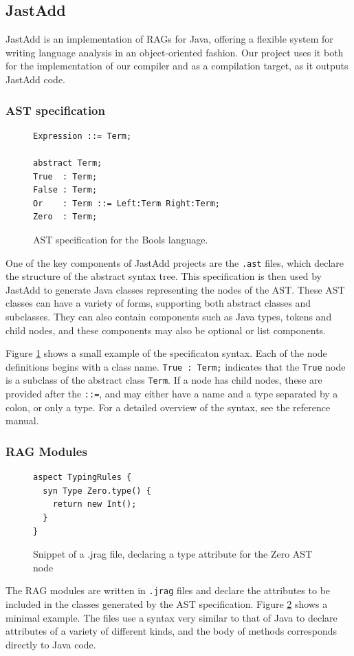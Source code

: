 \documentclass[nofilelist]{cslthse-msc}
\newcommand{\CR}[1]{\textcolor{green!60!black}{[\textbf{CR}:#1]}}
\begin{document}
\subsection{JastAdd}
JastAdd is an implementation of RAGs for Java, offering a flexible system for writing language analysis in an object-oriented fashion\cite{JastAdd}.
Our project uses it both for the implementation of our compiler and as a compilation target, as it outputs JastAdd code.

\subsubsection{AST specification}\label{astdef}
\begin{figure}[]
\begin{lstlisting}[]
Expression ::= Term;

abstract Term;
True  : Term;
False : Term;
Or    : Term ::= Left:Term Right:Term;
Zero  : Term;

\end{lstlisting}
  \caption{AST specification for the Bools language.}
  \label{astspecexample}
\end{figure}
One of the key components of JastAdd projects are the \lstinline{.ast} files, which declare the structure of the abstract syntax tree.
This specification is then used by JastAdd to generate Java classes representing the nodes of the AST.
These AST classes can have a variety of forms, supporting both abstract classes and subclasses.
They can also contain components such as Java types, tokens and child nodes, and these components may also be optional or list components.

Figure \ref{astspecexample} shows a small example of the specificaton syntax.
Each of the node definitions begins with a class name.
\lstinline{True : Term;} indicates that the \lstinline{True} node is a subclass of the abstract class \lstinline{Term}.
If a node has child nodes, these are provided after the \lstinline{::=}, and may either have a name and a type separated by a colon, or only a type.
For a detailed overview of the syntax, see the reference manual\cite{jastaddref}.

\subsubsection{RAG Modules}
\begin{figure}[]
\begin{lstlisting}[language=jrag]
aspect TypingRules {
  syn Type Zero.type() {
    return new Int();
  }
}
\end{lstlisting}
  \caption{Snippet of a .jrag file, declaring a type attribute for the Zero AST node}
  \label{jragexample}
\end{figure}
The RAG modules are written in \lstinline{.jrag} files and declare the attributes to be included in the classes generated by the AST specification.
Figure \ref{jragexample} shows a minimal example.
The files use a syntax very similar to that of Java to declare attributes of a variety of different kinds, and the body of methods corresponds directly to Java code.
\end{document}
